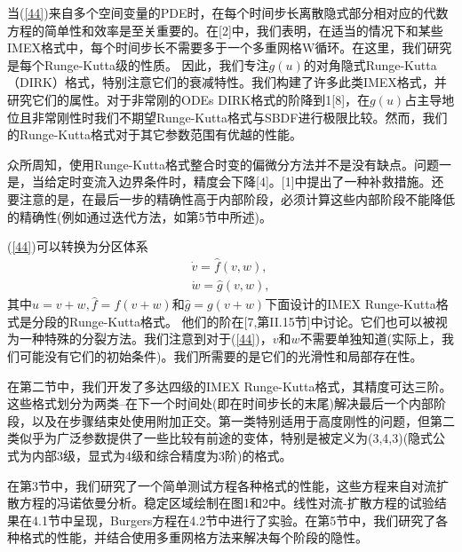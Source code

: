 \documentclass[12pt,a4paper]{article}
\begin{document}
当(\ref{44})来自多个空间变量的PDE时，在每个时间步长离散隐式部分相对应的代数方程的简单性和效率是至关重要的。在[2]中，我们表明，在适当的情况下和某些IMEX格式中，每个时间步长不需要多于一个多重网格W循环。在这里，我们研究是每个Runge-Kutta级的性质。 因此，我们专注$g(u)$的对角隐式Runge-Kutta（DIRK）格式，特别注意它们的衰减特性。我们构建了许多此类IMEX格式，并研究它们的属性。对于非常刚的ODEs DIRK格式的阶降到1[8]，在$g(u)$占主导地位且非常刚性时我们不期望Runge-Kutta格式与SBDF进行极限比较。然而，我们的Runge-Kutta格式对于其它参数范围有优越的性能。

众所周知，使用Runge-Kutta格式整合时变的偏微分方法并不是没有缺点。问题一是，当给定时变流入边界条件时，精度会下降[4]。[1]中提出了一种补救措施。还要注意的是，在最后一步的精确性高于内部阶段，必须计算这些内部阶段不能降低的精确性(例如通过迭代方法，如第5节中所述)。

(\ref{44})可以转换为分区体系
\begin{gather*}
\dot{v}=\widehat{f}(v,w),
\label{131} \\
\dot{w}=\widehat{g}(v,w),
\label{132}
\end{gather*}
其中$u=v+w,\widehat{f}=f(v+w)$和$\widehat{g}=g(v+w)$下面设计的IMEX Runge-Kutta格式是分段的Runge-Kutta格式。 他们的阶在[7,第II.15节]中讨论。它们也可以被视为一种特殊的分裂方法。我们注意到对于(\ref{44})，$v$和$w$不需要单独知道(实际上，我们可能没有它们的初始条件)。我们所需要的是它们的光滑性和局部存在性。

在第二节中，我们开发了多达四级的IMEX Runge-Kutta格式，其精度可达三阶。这些格式划分为两类--在下一个时间处(即在时间步长的末尾)解决最后一个内部阶段，以及在步骤结束处使用附加正交。第一类特别适用于高度刚性的问题，但第二类似乎为广泛参数提供了一些比较有前途的变体，特别是被定义为(3,4,3)(隐式公式为内部3级，显式为4级和综合精度为3阶)的格式。

在第3节中，我们研究了一个简单测试方程各种格式的性能，这些方程来自对流扩散方程的冯诺依曼分析。稳定区域绘制在图1和2中。线性对流-扩散方程的试验结果在4.1节中呈现，Burgers方程在4.2节中进行了实验。在第5节中，我们研究了各种格式的性能，并结合使用多重网格方法来解决每个阶段的隐性。
\end{document}
